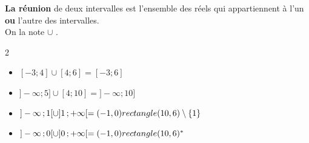 \begin{Définition}
{\bf{La réunion}} de deux intervalles est l'ensemble des réels qui appartiennent à l'un {\bf{ou}} l'autre des intervalles. \\
On la note $\cup$ .
\end{Définition}

\begin{Exemples}
\leavevmode\vspace{-\baselineskip}
\vspace{-0.5cm}
\setlength{\columnsep}{2cm}
\begin{multicols}{2}
\begin{itemize}[label=\textcolor{Couleur10}{$\bullet$}]
\item $[-3\mathpunct{} ;4]\cup[4\mathpunct{} ;6]=[-3\mathpunct{} ;6]$
\item $]-\infty\mathpunct{} ;5]\cup[4\mathpunct{} ;10]=]-\infty\mathpunct{} ;10]$
\item $]-\infty\mathpunct{} ;1[\cup]1\mathpunct{} ;+\infty[=(-1,0) rectangle (10,6)\setminus\{1\}$ 
\item  $]-\infty\mathpunct{} ;0[\cup]0\mathpunct{} ;+\infty[=(-1,0) rectangle (10,6)^\ast$
\end{itemize}
\end{multicols}
\end{Exemples}

